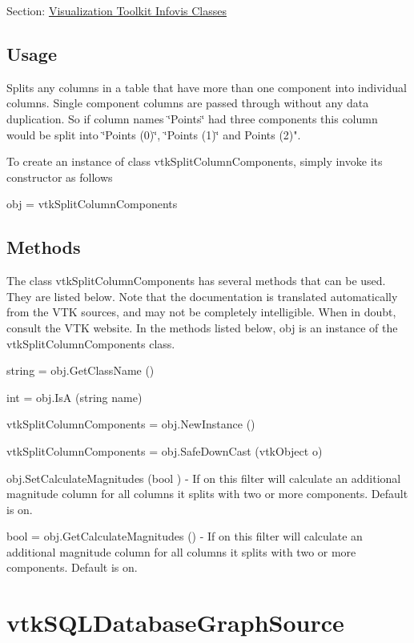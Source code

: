 Section\-: \hyperlink{sec_vtkinfovis}{Visualization Toolkit Infovis Classes} \hypertarget{vtkwidgets_vtkxyplotwidget_Usage}{}\subsection{Usage}\label{vtkwidgets_vtkxyplotwidget_Usage}
Splits any columns in a table that have more than one component into individual columns. Single component columns are passed through without any data duplication. So if column names \char`\"{}\-Points\char`\"{} had three components this column would be split into \char`\"{}\-Points (0)\char`\"{}, \char`\"{}\-Points (1)\char`\"{} and Points (2)".

To create an instance of class vtk\-Split\-Column\-Components, simply invoke its constructor as follows \begin{DoxyVerb}  obj = vtkSplitColumnComponents
\end{DoxyVerb}
 \hypertarget{vtkwidgets_vtkxyplotwidget_Methods}{}\subsection{Methods}\label{vtkwidgets_vtkxyplotwidget_Methods}
The class vtk\-Split\-Column\-Components has several methods that can be used. They are listed below. Note that the documentation is translated automatically from the V\-T\-K sources, and may not be completely intelligible. When in doubt, consult the V\-T\-K website. In the methods listed below, {\ttfamily obj} is an instance of the vtk\-Split\-Column\-Components class. 
\begin{DoxyItemize}
\item {\ttfamily string = obj.\-Get\-Class\-Name ()}  
\item {\ttfamily int = obj.\-Is\-A (string name)}  
\item {\ttfamily vtk\-Split\-Column\-Components = obj.\-New\-Instance ()}  
\item {\ttfamily vtk\-Split\-Column\-Components = obj.\-Safe\-Down\-Cast (vtk\-Object o)}  
\item {\ttfamily obj.\-Set\-Calculate\-Magnitudes (bool )} -\/ If on this filter will calculate an additional magnitude column for all columns it splits with two or more components. Default is on.  
\item {\ttfamily bool = obj.\-Get\-Calculate\-Magnitudes ()} -\/ If on this filter will calculate an additional magnitude column for all columns it splits with two or more components. Default is on.  
\end{DoxyItemize}\hypertarget{vtkinfovis_vtksqldatabasegraphsource}{}\section{vtk\-S\-Q\-L\-Database\-Graph\-Source}\label{vtkinfovis_vtksqldatabasegraphsource}
